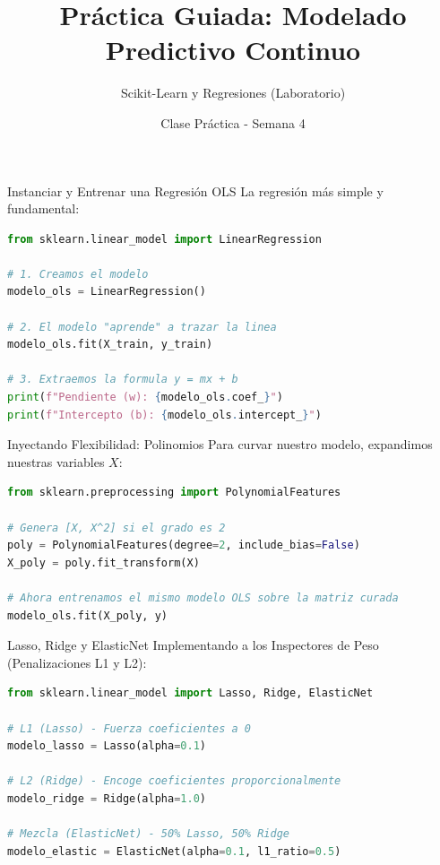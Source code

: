 \documentclass[aspectratio=169]{beamer}
\title{Práctica Guiada: Modelado Predictivo Continuo}
\subtitle{Scikit-Learn y Regresiones (Laboratorio)}
\author{Clase Práctica - Semana 4}
\date{}
\begin{document}
\begin{frame}
    \titlepage
\end{frame}

\begin{frame}[fragile]{Instanciar y Entrenar una Regresión OLS}
    La regresión más simple y fundamental:
    
\begin{lstlisting}[language=Python]
from sklearn.linear_model import LinearRegression

# 1. Creamos el modelo
modelo_ols = LinearRegression()

# 2. El modelo "aprende" a trazar la linea
modelo_ols.fit(X_train, y_train)

# 3. Extraemos la formula y = mx + b
print(f"Pendiente (w): {modelo_ols.coef_}")
print(f"Intercepto (b): {modelo_ols.intercept_}")
\end{lstlisting}
    
\end{frame}

\begin{frame}[fragile]{Inyectando Flexibilidad: Polinomios}
    Para curvar nuestro modelo, expandimos nuestras variables $X$:
    
\begin{lstlisting}[language=Python]
from sklearn.preprocessing import PolynomialFeatures

# Genera [X, X^2] si el grado es 2
poly = PolynomialFeatures(degree=2, include_bias=False)
X_poly = poly.fit_transform(X)

# Ahora entrenamos el mismo modelo OLS sobre la matriz curada
modelo_ols.fit(X_poly, y)
\end{lstlisting}
    
\end{frame}

\begin{frame}[fragile]{Lasso, Ridge y ElasticNet}
    Implementando a los Inspectores de Peso (Penalizaciones L1 y L2):
    
\begin{lstlisting}[language=Python]
from sklearn.linear_model import Lasso, Ridge, ElasticNet

# L1 (Lasso) - Fuerza coeficientes a 0
modelo_lasso = Lasso(alpha=0.1)

# L2 (Ridge) - Encoge coeficientes proporcionalmente
modelo_ridge = Ridge(alpha=1.0)

# Mezcla (ElasticNet) - 50% Lasso, 50% Ridge
modelo_elastic = ElasticNet(alpha=0.1, l1_ratio=0.5)
\end{lstlisting}
    
\end{frame}
\end{document}
